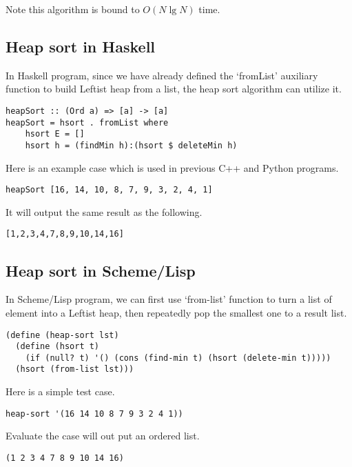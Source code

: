 \documentclass{article}
\begin{document}
Note this algorithm is bound to $O(N \lg N)$ time.

\subsection*{Heap sort in Haskell}

In Haskell program, since we have already defined the `fromList'
auxiliary function to build Leftist heap from a list, the heap sort
algorithm can utilize it.

\lstset{language=Haskell}
\begin{lstlisting}
heapSort :: (Ord a) => [a] -> [a]
heapSort = hsort . fromList where
    hsort E = []
    hsort h = (findMin h):(hsort $ deleteMin h)
\end{lstlisting} %

Here is an example case which is used in previous C++ and Python
programs.

\begin{lstlisting}
heapSort [16, 14, 10, 8, 7, 9, 3, 2, 4, 1]
\end{lstlisting}

It will output the same result as the following.

\begin{verbatim}
[1,2,3,4,7,8,9,10,14,16]
\end{verbatim}

\subsection*{Heap sort in Scheme/Lisp}

In Scheme/Lisp program, we can first use `from-list' function
to turn a list of element into a Leftist heap, then repeatedly
pop the smallest one to a result list.

\lstset{language=lisp}
\begin{lstlisting}
(define (heap-sort lst)
  (define (hsort t)
    (if (null? t) '() (cons (find-min t) (hsort (delete-min t)))))
  (hsort (from-list lst)))
\end{lstlisting}

Here is a simple test case.

\begin{lstlisting}
heap-sort '(16 14 10 8 7 9 3 2 4 1))
\end{lstlisting}

Evaluate the case will out put an ordered list.

\begin{lstlisting}
(1 2 3 4 7 8 9 10 14 16)
\end{lstlisting}
\end{document}
